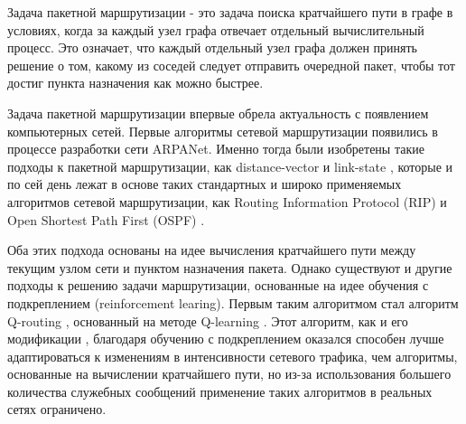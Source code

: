 \documentclass[specification, annotation]{itmo-student-thesis}
\begin{document}
\graphicspath{{img/}}


\tableofcontents

\startprefacepage

Задача пакетной маршрутизации - это задача поиска кратчайшего пути в графе в условиях,
когда за каждый узел графа отвечает отдельный вычислительный процесс. Это
означает, что каждый отдельный узел графа должен принять решение о том, какому
из соседей следует отправить очередной пакет, чтобы тот достиг пункта назначения
как можно быстрее.

Задача пакетной маршрутизации впервые обрела актуальность с появлением
компьютерных сетей. Первые алгоритмы сетевой маршрутизации появились в процессе
разработки сети ARPANet. Именно тогда были изобретены такие подходы к пакетной
маршрутизации, как distance-vector \cite{arpanet-orig} и
link-state \cite{link-state-arpanet}, которые и по сей день лежат в основе таких
стандартных и широко применяемых алгоритмов сетевой маршрутизации, как Routing
Information Protocol (RIP) \cite{rip-rfc} и Open Shortest Path First (OSPF) \cite{ospf-rfc}.

Оба этих подхода основаны на идее вычисления кратчайшего пути между текущим
узлом сети и пунктом назначения пакета. Однако существуют и другие подходы к
решению задачи маршрутизации, основанные на идее обучения с подкреплением
(reinforcement learing). Первым таким алгоритмом стал алгоритм
Q-routing \cite{q-routing-orig}, основанный на методе
Q-learning \cite{q-learning-orig}. Этот алгоритм, как и его
модификации \cite{predictive-q-routing, dual-q-routing},
благодаря обучению с подкреплением оказался способен лучше адаптироваться к
изменениям в интенсивности сетевого трафика, чем алгоритмы, основанные на
вычислении кратчайшего пути, но из-за использования большего количества
служебных сообщений применение таких алгоритмов в реальных сетях ограничено.
\end{document}
